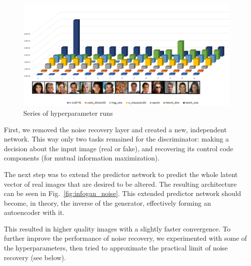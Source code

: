 \documentclass{egpubl}
\begin{document}
\begin{figure}[!ht]
	\centering
	\includegraphics[width=\textwidth]{pic/hyperparamopt}
	\caption{Series of hyperparameter runs}
	\label{fig:hyperparamteres}
\end{figure}

First, we removed the noise recovery layer and created a new, independent network. This way only two tasks %
remained for the discriminator: making a decision about the input image (real or fake), %
and %
recovering its control code components (for mutual information maximization).

The next step was to extend the predictor network to predict the whole latent vector of real images that are desired to be altered. The resulting architecture can be seen in Fig.~\ref{fig:infogan_noise}. This extended predictor network should become, in theory, the inverse of the generator, effectively forming an autoencoder with it.

This resulted in higher quality images %
with a slightly faster convergence. To further improve the performance of noise recovery, %
we experimented with some of the hyperparameters, then tried to approximate the practical limit of noise recovery (see below).
\end{document}
